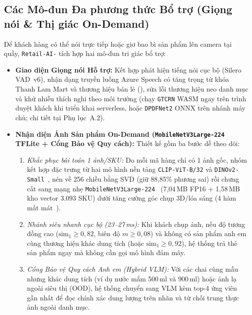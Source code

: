 \subsection*{Các Mô-đun Đa phương thức Bổ trợ (Giọng nói \& Thị giác On-Demand)}
Để khách hàng có thể nói trực tiếp hoặc giơ bao bì sản phẩm lên camera tại quầy, \texttt{Retail-AI-} tích hợp hai mô-đun tri giác bổ trợ:
\begin{itemize}
    \item \textbf{Giao diện Giọng nói Hỗ trợ:} Kết hợp phát hiện tiếng nói cục bộ (Silero VAD~v6), nhận dạng truyền luồng Azure Speech có tăng trọng từ khóa Thanh Lam Mart và thương hiệu bán lẻ (), sửa lỗi thương hiệu neo danh mục và khử nhiễu thích nghi theo môi trường (chạy \texttt{GTCRN} WASM ngay trên trình duyệt khách khi triển khai serverless, hoặc \texttt{DPDFNet2} ONNX trên nhánh máy chủ; chi tiết tại Phụ lục~A.2).
    \item \textbf{Nhận diện Ảnh Sản phẩm On-Demand (\texttt{MobileNetV3Large-224} TFLite + Cổng Bảo vệ Quy cách):} Thiết kế gồm ba bước dễ theo dõi:
    \begin{enumerate}[leftmargin=1.5em, itemsep=1pt]
        \item \emph{Khắc phục bài toán 1 ảnh/SKU:} Do mỗi mã hàng chỉ có 1 ảnh gốc, nhóm kết hợp đặc trưng từ hai mô hình nền tảng \texttt{CLIP-ViT-B/32} và \texttt{DINOv2-Small}~\cite{radford2021clip,oquab2024dinov2}, nén về 256 chiều bằng SVD (giữ 88,85\% phương sai) rồi chưng cất sang mạng nhẹ \texttt{MobileNetV3Large-224}~\cite{howard2019mobilenetv3,retail_tflite_kaggle} (7,04\,MB FP16 + 1,58\,MB kho vector 3.093 SKU) dưới tăng cường góc chụp 3D/lóa sáng (4 hàm mất mát~\cite{deng2020subcenter,khosla2020supcon}).
        \item \emph{Nhánh siêu nhanh cục bộ (23--27\,ms):} Khi khách chụp ảnh, nếu độ tương đồng cao ($\text{sim}_1 \ge 0{,}82$, biên độ $m \ge 0{,}08$) và không có sản phẩm anh em cùng thương hiệu khác dung tích (hoặc $\text{sim}_1 \ge 0{,}92$), hệ thống trả thẻ sản phẩm ngay mà không cần gọi mô hình đám mây.
        \item \emph{Cổng Bảo vệ Quy cách Anh em (Hybrid VLM):} Với các chai cùng mẫu nhưng khác dung tích (ví dụ nước mắm 500\,ml và 900\,ml) hoặc ảnh lạ ngoài siêu thị (OOD), hệ thống chuyển sang VLM kèm top-4 ứng viên gần nhất để đọc chính xác dung lượng trên nhãn và từ chối trung thực ảnh ngoài danh mục.
    \end{enumerate}
\end{itemize}

